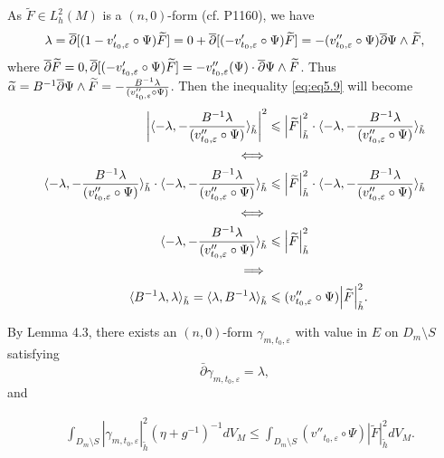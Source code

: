 \begin{remark}
  As $\widetilde{F}\in L_h^2(M)$ is a $(n,0)$-form (cf. P1160), we have $$\lambda=\overline{\partial} [(1-v_{t_0,\varepsilon}'\circ\Psi)\widetilde{F}]=0+\overline{\partial}[(-v_{t_0,\varepsilon}'\circ\Psi)\widetilde{F}]=-(v_{t_0,\varepsilon}''\circ\Psi)\overline{\partial}\Psi\wedge\widetilde{F},$$ 
  where $\overline{\partial} \widetilde{F}=0, \overline{\partial}[(-v_{t_0,\varepsilon}'\circ\Psi)\widetilde{F}]=-v_{t_0,\varepsilon}''(\Psi)\cdot \overline{\partial}\Psi\wedge \widetilde{F}$.
  Thus $\widetilde{\alpha}=B^{-1}\overline{\partial} \Psi\wedge \widetilde{F}=-\frac{B^{-1}\lambda}{(v_{t_0,\varepsilon}''\circ\Psi)}$. Then the inequality \eqref{eq:eq5.9} will become
  \begin{align*}
\abs{\langle -\lambda,-\frac{B^{-1}\lambda}{(v_{t_0,\varepsilon}''\circ\Psi)}\rangle_{\tilde{h}}}^2 &\leqslant \abs{\widetilde{F}}^2_{\tilde{h}}\cdot \langle -\lambda,-\frac{B^{-1}\lambda}{(v_{t_0,\varepsilon}''\circ\Psi)}\rangle_{\tilde{h}}\\ 
\iff\\
\langle -\lambda,-\frac{B^{-1}\lambda}{(v_{t_0,\varepsilon}''\circ\Psi)}\rangle_{\tilde{h}}\cdot \langle -\lambda,-\frac{B^{-1}\lambda}{(v_{t_0,\varepsilon}''\circ\Psi)}\rangle_{\tilde{h}} & \leqslant \abs{\widetilde{F}}^2_{\tilde{h}}\cdot \langle -\lambda,-\frac{B^{-1}\lambda}{(v_{t_0,\varepsilon}''\circ\Psi)}\rangle_{\tilde{h}}\\ 
\iff\\ 
\langle -\lambda,-\frac{B^{-1}\lambda}{(v_{t_0,\varepsilon}''\circ\Psi)}\rangle_{\tilde{h}}& \leqslant \abs{\widetilde{F}}^2_{\tilde{h}}\\ 
\implies\\ 
\langle B^{-1}\lambda,\lambda\rangle_{\tilde{h}}=\langle \lambda,B^{-1}\lambda\rangle_{\tilde{h}}& \leqslant (v_{t_0,\varepsilon}''\circ\Psi)\abs{\widetilde{F}}^2_{\tilde{h}}.
  \end{align*}
\end{remark}

By Lemma 4.3, there exists an $(n,0)$-form
$\gamma_{m,t_0,\varepsilon}$ with value in $E$ on $D_{m}\setminus S$
satisfying
$$\bar{\partial}\gamma_{m,t_0,\varepsilon}=\lambda,$$
and

\begin{equation}
 \label{equ:smooth.vector3.2}
 \begin{split}
 &\int_{ D_m\setminus S}|\gamma_{m,t_0,\varepsilon}|^{2}_{\tilde{h}}(\eta+g^{-1})^{-1}dV_{M}
  \leq\int_{D_m\setminus S}(v''_{t_0,\varepsilon}\circ{\Psi})| \tilde{F}|^2_{\tilde{h}}dV_M.
  \end{split}
\end{equation}

